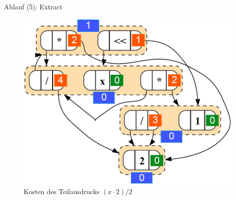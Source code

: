 \begin{frame}{Ablauf (5): Extract}
    \begin{figure}[H]
        \centering
        \includegraphics[scale=0.32]{utils/exp_egraph_colored.png}
        \caption{Kosten des Teilausdrucks $(x \cdot 2) / 2$}
        \label{fig:exp_egraph_costs}
    \end{figure}
\end{frame}